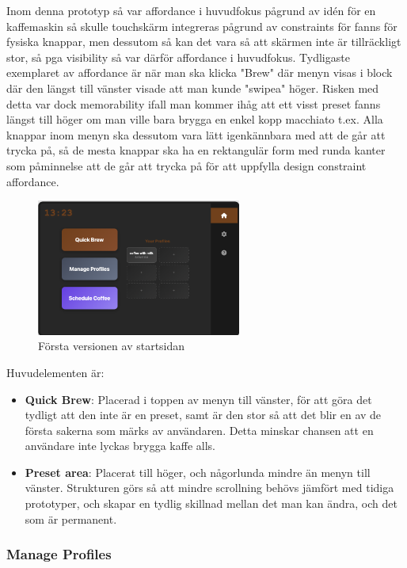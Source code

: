 Inom denna prototyp så var affordance i huvudfokus pågrund av idén för en kaffemaskin så skulle touchskärm integreras pågrund av constraints för fanns för fysiska knappar, men dessutom så kan det vara så att skärmen inte är tillräckligt stor, så pga visibility så var därför affordance i huvudfokus. Tydligaste exemplaret av affordance är när man ska klicka "Brew" där menyn visas i block där den längst till vänster visade att man kunde "swipea" höger. Risken med detta var dock memorability ifall man kommer ihåg att ett visst preset fanns längst till höger om man ville bara brygga en enkel kopp macchiato t.ex. Alla knappar inom menyn ska dessutom vara lätt igenkännbara med att de går att trycka på, så de mesta knappar ska ha en rektangulär form med runda kanter som påminnelse att de går att trycka på för att uppfylla design constraint affordance.

\begin{figure}[H]
    \centering
    \includegraphics[width=0.6\textwidth]{bilder/start.png}
    \caption{Första versionen av startsidan}
    \label{fig:startsida_v1}
\end{figure}

Huvudelementen är:
\begin{itemize}
    \item \textbf{Quick Brew}: Placerad i toppen av menyn till vänster, för att göra det tydligt att den inte är en preset, samt är den stor så att det blir en av de första sakerna som märks av användaren. Detta minskar chansen att en användare inte lyckas brygga kaffe alls.     

    \item \textbf{Preset area}: Placerat till höger, och någorlunda mindre än menyn till vänster. Strukturen görs så att mindre scrollning behövs jämfört med tidiga prototyper, och skapar en tydlig skillnad mellan det man kan ändra, och det som är permanent. 
\end{itemize}

\subsubsection{Manage Profiles}

